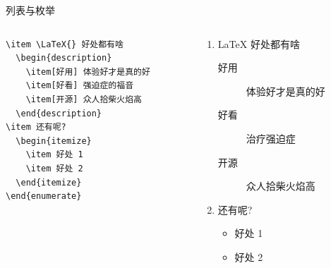 \begin{frame}[fragile]{列表与枚举}
\begin{columns}
\begin{column}{.5\textwidth}

\begin{verbatim}
\item \LaTeX{} 好处都有啥
  \begin{description}
    \item[好用] 体验好才是真的好
    \item[好看] 强迫症的福音
    \item[开源] 众人拾柴火焰高
  \end{description}
\item 还有呢?
  \begin{itemize}
    \item 好处 1
    \item 好处 2
  \end{itemize}
\end{enumerate}
\end{verbatim}
\end{column}
\begin{column}{.5\textwidth}
\begin{enumerate}
\item \LaTeX{} 好处都有啥
  \begin{description}
    \item[好用] 体验好才是真的好
    \item[好看] 治疗强迫症
    \item[开源] 众人拾柴火焰高
  \end{description}
\item 还有呢?
  \begin{itemize}
    \item 好处 1
    \item 好处 2
  \end{itemize}
\end{enumerate}
\end{column}
\end{columns}

\end{frame}


